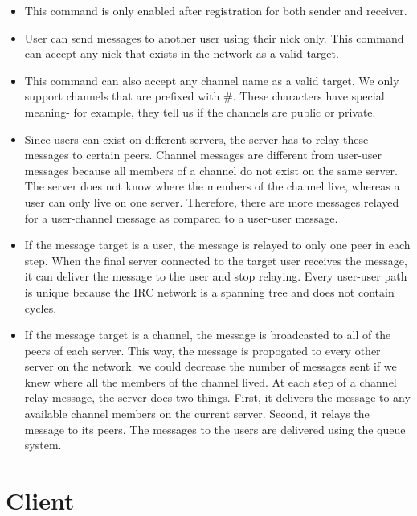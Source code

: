 \documentclass[letterpaper,twocolumn,10pt]{article}
\begin{document}
\begin{itemize}

	\item This command is only enabled after registration for both sender and
	      receiver.

	\item User can send messages to another user using their nick only.
	      This command can accept any nick that exists in the network as a valid
	      target.

	\item This command can also accept any channel name as a valid target. We only
	      support channels that are prefixed with \#. These characters have special meaning-
	      for example, they tell us if the channels are public or private.

	\item Since users can exist on different servers, the server has to relay
	      these messages to certain peers. Channel messages are different from user-user messages
	      because all members of a channel do not exist on the same server. The server does not know
	      where the members of the channel live, whereas a user can only live on one server. Therefore,
	      there are more messages relayed for a user-channel message as compared to a user-user message.

	\item If the message target is a user, the message is relayed to only one
	      peer in each step. When the final server connected to the target user receives the message,
	      it can deliver the message to the user and stop relaying. Every user-user
	      path is unique because the IRC network is a spanning tree
	      and does not contain cycles.

	\item If the message target is a channel, the message is broadcasted
	      to all of the peers of each server. This way, the message is propogated to every
	      other server on the network. we could decrease the number of messages sent if we knew where all the members of the channel lived.
	      At each step
	      of a channel relay message, the server does two things. First, it delivers the message
	      to any available channel members on the current server. Second, it relays the message to
	      its peers. The messages to the users are delivered using the queue system.
\end{itemize}

\section{Client}
\end{document}
